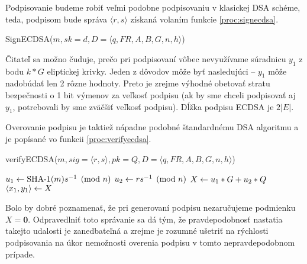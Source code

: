 Podpisovanie budeme robiť veľmi podobne podpisovaniu v klasickej DSA
schéme, teda, podpisom bude správa $\langle r,s \rangle$ získaná 
volaním funkcie \ref{proc:signecdsa}.

\begin{procedure}[!h]
    \caption{SignECDSA($m,sk=d, D=\langle q,FR, A,B,G,n,h \rangle$)}
    \label{proc:signecdsa}
    \;
\end{procedure}

Čitateľ sa možno čuduje, prečo pri podpisovaní vôbec nevyužívame
súradnicu $y_1$ z bodu $k*G$ eliptickej krivky. Jeden z dôvodov môže
byť nasledujúci -- $y_1$ môže nadobúdať len 2 rôzne hodnoty. Preto
je zrejme výhodné obetovať stratu bezpečnosti o 1 bit výmenov za veľkosť
podpisu (ak by sme chceli podpisovať aj $y_1$, potrebovali by sme
zväčšiť veľkosť podpisu). Dĺžka podpisu ECDSA je $2|E|$.

Overovanie podpisu je taktiež nápadne podobné štandardnému DSA
algoritmu a je popísané vo funkcii \ref{proc:verifyecdsa}.

\begin{procedure}[!h]
    \caption{verifyECDSA($m,sig=\langle r,s \rangle,pk= Q,
            D=\langle q,FR, A,B,G,n,h \rangle$)}
    \label{proc:verifyecdsa}
    \;
    $u_1 \leftarrow \mbox{SHA-1}(m) s^{-1}\pmod{n}$ \;
    $u_2 \leftarrow r s^{-1} \pmod{n}$ \;
    $X \leftarrow u_1 * G + u_2 * Q$ \;
    $ \langle x_1, y_1 \rangle \leftarrow X$ \;
\end{procedure}

Bolo by dobré poznamenať, že pri generovaní podpisu nezaručujeme
podmienku $X=\mathbf{0}$. Odpravedlniť toto správanie sa dá tým, že
pravdepodobnosť nastatia takejto udalosti je zanedbateľná a zrejme
je rozumné ušetriť na rýchlosti podpisovania
na úkor nemožnosti overenia podpisu v tomto nepravdepodobnom prípade.

